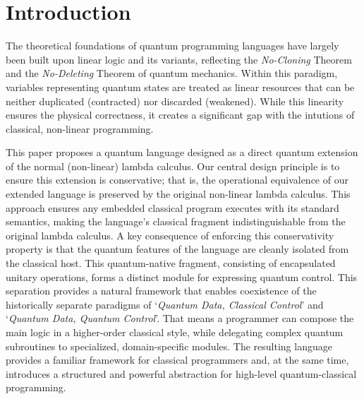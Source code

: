 \section{Introduction} \label{sec:intro}
The theoretical foundations of quantum programming languages have largely been built upon linear logic and its variants\cite{VANTONDER2004_LambdaCalculusQuantum,SELINGER2009_QuantumLambdaCalculus,ALTENKIRCH2005_FunctionalQuantumProgramming,SABRY2018_SymmetricPatternMatchingQuantum,ROSS2017_AlgebraicLogicalMethods}, reflecting the \textit{No-Cloning} Theorem\cite{WOOTTERS1982_SingleQuantumCannota} and the \textit{No-Deleting} Theorem\cite{KUMARPATI2000_ImpossibilityDeletingUnknowna} of quantum mechanics.
Within this paradigm, variables representing quantum states are treated as linear resources that can be neither duplicated (contracted) nor discarded (weakened).
While this linearity ensures the physical correctness, it creates a significant gap with the intutions of classical, non-linear programming.

This paper proposes a quantum language designed as a direct quantum extension of the normal (non-linear) lambda calculus.
Our central design principle is to ensure this extension is conservative; that is, the operational equivalence of our extended language is preserved by the original non-linear lambda calculus.
This approach ensures any embedded classical program executes with its standard semantics, making the language's classical fragment indistinguishable from the original lambda calculus.
A key consequence of enforcing this conservativity property is that the quantum features of the language are cleanly isolated from the classical host.
This quantum-native fragment, consisting of encapsulated unitary operations, forms a distinct module for expressing quantum control.
This separation provides a natural framework that enables coexistence of the historically separate paradigms of `\textit{Quantum Data, Classical Control}'\cite{SELINGER2004_QuantumProgrammingLanguage} and `\textit{Quantum Data, Quantum Control}'\cite{DÍAZ-CARO2022_QuickOverviewQuantum}.
That means a programmer can compose the main logic in a higher-order classical style, while delegating complex quantum subroutines to specialized, domain-specific modules.
The resulting language provides a familiar framework for classical programmers and, at the same time, introduces a structured and powerful abstraction for high-level quantum-classical programming.
